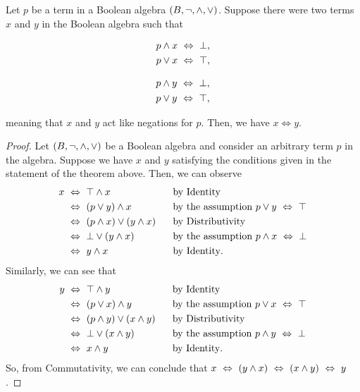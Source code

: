 \begin{theorem}\label{thm:unique}
    Let \(p\) be a term in a Boolean algebra \((B, \neg, \wedge, \vee)\).
    Suppose there were two terms \(x\) and \(y\) in the Boolean algebra such that
    \begin{center}
        \vspace{-\parskip-\abovedisplayskip}
        \begin{minipage}{.2\linewidth}
            \begin{align*}
                p \wedge x &~\Leftrightarrow~ \bot,\\
                p \vee x &~\Leftrightarrow~ \top,
            \end{align*}
        \end{minipage}%
        \begin{minipage}{.2\linewidth}
            \begin{align*}
                p \wedge y &~\Leftrightarrow~ \bot,\\
                p \vee y &~\Leftrightarrow~ \top,
            \end{align*}
        \end{minipage}
    \end{center}
    meaning that \(x\) and \(y\) act like negations for \(p\).
    Then, we have \(x \iff y\).
\end{theorem}
\begin{proof}
    Let \((B, \neg, \wedge, \vee)\) be a Boolean algebra
    and consider an arbitrary term \(p\) in the algebra.
    Suppose we have \(x\) and \(y\) satisfying the conditions given in the statement of the theorem above.
    Then, we can observe
    \begin{alignat*}{2}
        x &~\Leftrightarrow~ \top \wedge x ~~~~~~~~~~~~~~~~&&\text{by Identity}\\
          &~\Leftrightarrow~ (p \vee y) \wedge x &&\text{by the assumption \(p \vee y ~\Leftrightarrow~\top\)}\\
          &~\Leftrightarrow~ (p \wedge x) \vee (y \wedge x) &&\text{by Distributivity}\\
          &~\Leftrightarrow~ \bot \vee (y \wedge x) &&\text{by the assumption \(p \wedge x ~\Leftrightarrow~\bot\)}\\
          &~\Leftrightarrow~ y \wedge x &&\text{by Identity}.
    \end{alignat*}
    Similarly, we can see that
    \begin{alignat*}{2}
        y &~\Leftrightarrow~ \top \wedge y ~~~~~~~~~~~~~~~~&&\text{by Identity}\\
          &~\Leftrightarrow~ (p \vee x) \wedge y &&\text{by the assumption \(p \vee x ~\Leftrightarrow~\top\)}\\
          &~\Leftrightarrow~ (p \wedge y) \vee (x \wedge y) &&\text{by Distributivity}\\
          &~\Leftrightarrow~ \bot \vee (x \wedge y) &&\text{by the assumption \(p \wedge y ~\Leftrightarrow~\bot\)}\\
          &~\Leftrightarrow~ x \wedge y &&\text{by Identity}.
    \end{alignat*}
    So, from Commutativity, we can conclude that \(x ~\Leftrightarrow~ (y \wedge x) ~\Leftrightarrow~ (x \wedge y) ~\Leftrightarrow~ y\).
\end{proof}

